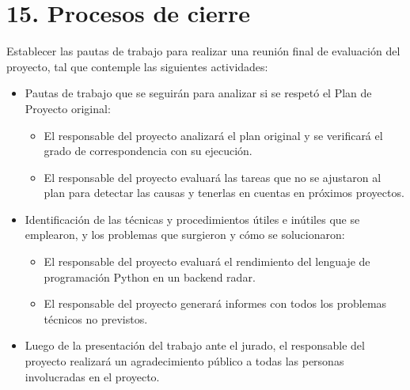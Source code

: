 \documentclass[
11pt, %
]{charter}
\begin{document}
\section{15. Procesos de cierre}    
\label{sec:cierre}

Establecer las pautas de trabajo para realizar una reunión final de evaluación del proyecto, tal que contemple las siguientes actividades:

\begin{itemize}
	\item Pautas de trabajo que se seguirán para analizar si se respetó el Plan de Proyecto original:
        \begin{itemize}
            \item El responsable del proyecto analizará el plan original y se verificará el grado de correspondencia con su ejecución.
            \item El responsable del proyecto evaluará las tareas que no se ajustaron al plan para detectar las causas y tenerlas en cuentas en próximos proyectos.
	    \end{itemize}

    \item Identificación de las técnicas y procedimientos útiles e inútiles que se emplearon, y los problemas que surgieron y cómo se solucionaron:
	    \begin{itemize}
            \item El responsable del proyecto evaluará el rendimiento del
              lenguaje de programación Python en un backend radar.
            \item El responsable del proyecto generará informes con todos los problemas técnicos no previstos.
        \end{itemize}
	\item Luego de la presentación del trabajo ante el jurado, el responsable del proyecto realizará un agradecimiento público a todas las personas involucradas en el proyecto. 
\end{itemize}
\end{document}
